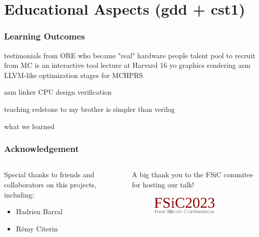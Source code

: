 \documentclass[aspectratio=169]{beamer}
\begin{document}
\section{Educational Aspects (gdd + cst1)}

\begin{frame}
	\frametitle{Learning Outcomes}
	testimonials from ORE who became "real" hardware people
	talent pool to recruit from
	MC is an interactive tool
	lecture at Harvard
	16 yo
	graphics rendering
	asm
	LLVM-like optimization stages for MCHPRS

	asm
	linker
	CPU design
	verification

	teaching redstone to my brother is simpler than verilog

	what we learned
\end{frame}

\begin{frame}
	\frametitle{Acknowledgement}
	\begin{columns}
		\begin{column}{0.5\textwidth}
			Special thanks to friends and collaborators on this projects,
			including:
			\begin{itemize}
				\item Hadrien Barral
				\item Rémy Citerin
			\end{itemize}
		\end{column}
		\begin{column}{0.5\textwidth}
			A big thank you to the FSiC commitee for hosting our talk!
			\begin{figure}
				\includegraphics[width=0.75\textwidth]{imgs/Fsic2023_logo.png}
			\end{figure}
		\end{column}
	\end{columns}
\end{frame}
\end{document}
